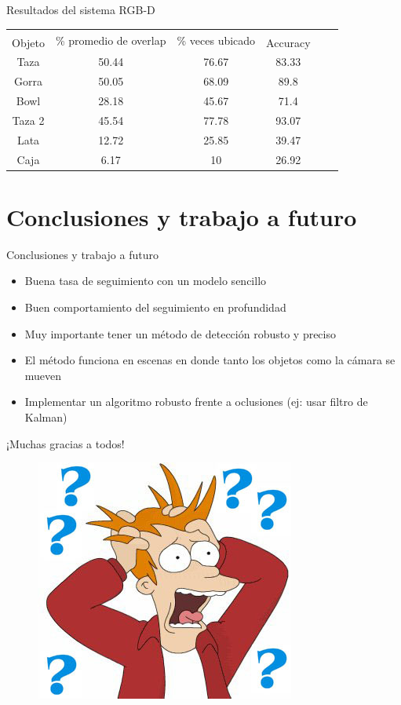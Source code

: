 \documentclass[]{beamer}
\begin{document}
\begin{frame}[t]{Resultados del sistema RGB-D}
    \begin{table}[h]
    	\centering
        \begin{tabular}{|c|c|c|c|c|c|}
        \hline
        & \multirow{2}{2.4cm}{\% promedio de overlap} & \multirow{2}{2cm}{\% veces ubicado} &\\
    	Objeto & & & Accuracy\\
    	\hline
        Taza    & 50.44      & 76.67     & 83.33 \\
        \hline
        Gorra   & 50.05      & 68.09     & 89.8 \\
        \hline
        Bowl    & 28.18      & 45.67     & 71.4 \\
        \hline
        Taza 2  & 45.54      & 77.78     & 93.07 \\
        \hline
        Lata    & 12.72      & 25.85     & 39.47 \\
        \hline
        Caja    &  6.17      &    10     & 26.92 \\
        \hline
        \end{tabular}
    \end{table}
\end{frame}


\section{Conclusiones y trabajo a futuro}
\begin{frame}{Conclusiones y trabajo a futuro}
    \begin{itemize}
        \item Buena tasa de seguimiento con un modelo sencillo
        \item Buen comportamiento del seguimiento en profundidad
        \item Muy importante tener un método de detección robusto y preciso
        \item El método funciona en escenas en donde tanto los objetos como la cámara se mueven
        \item Implementar un algoritmo robusto frente a oclusiones (ej: usar filtro de Kalman)
    \end{itemize}
\end{frame}

\begin{frame}[t]{¡Muchas gracias a todos!}
    \begin{figure}
        \centering
        \includegraphics[scale=0.5]{img/preguntas.jpg}
    \end{figure}
\end{frame}
\end{document}
